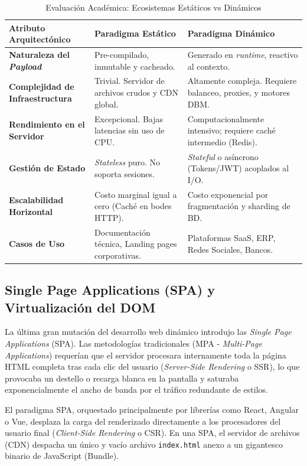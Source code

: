 \documentclass[11pt,a4paper,oneside]{report}
\begin{document}
\begin{table}[htpb]
\centering
\caption{Evaluaci\'on Acad\'emica: Ecosistemas Est\'aticos vs Din\'amicos}
\label{tab:static_vs_dynamic}
\vspace{2mm}
\begin{tabular}{@{}p{3cm}p{5.5cm}p{5.5cm}@{}}
\toprule
\textbf{Atributo Arquitect\'onico} & \textbf{Paradigma Est\'atico} & \textbf{Paradigma Din\'amico} \\
\midrule
\textbf{Naturaleza del \textit{Payload}} & Pre-compilado, inmutable y cacheado. & Generado en \textit{runtime}, reactivo al contexto. \\
\textbf{Complejidad de Infraestructura} & Trivial. Servidor de archivos crudos y CDN global. & Altamente compleja. Requiere balanceo, proxies, y motores DBM. \\
\textbf{Rendimiento en el Servidor} & Excepcional. Bajas latencias sin uso de CPU. & Computacionalmente intensivo; requiere cach\'e intermedio (Redis). \\
\textbf{Gesti\'on de Estado} & \textit{Stateless} puro. No soporta sesiones. & \textit{Stateful} o as\'incrono (Tokens/JWT) acoplados al I/O. \\
\textbf{Escalabilidad Horizontal} & Costo marginal igual a cero (Cach\'e en bodes HTTP). & Costo exponencial por fragmentaci\'on y sharding de BD. \\
\textbf{Casos de Uso} & Documentaci\'on t\'ecnica, Landing pages corporativas. & Plataformas SaaS, ERP, Redes Sociales, Bancos. \\
\bottomrule
\end{tabular}
\end{table}

\subsection{Single Page Applications (SPA) y Virtualizaci\'on del DOM}

La \'ultima gran mutaci\'on del desarrollo web din\'amico introdujo las \textit{Single Page Applications} (SPA). Las metodolog\'ias tradicionales (MPA - \textit{Multi-Page Applications}) requer\'ian que el servidor procesara internamente toda la p\'agina HTML completa tras cada clic del usuario (\textit{Server-Side Rendering} o SSR), lo que provocaba un destello o recarga blanca en la pantalla y saturaba exponencialmente el ancho de banda por el tr\'afico redundante de estilos.

El paradigma SPA, orquestado principalmente por librer\'ias como React, Angular o Vue, desplaza la carga del renderizado directamente a los procesadores del usuario final (\textit{Client-Side Rendering} o CSR). En una SPA, el servidor de archivos (CDN) despacha un \'unico y vac\'io archivo \texttt{index.html} anexo a un gigantesco binario de JavaScript (Bundle). 
\end{document}

